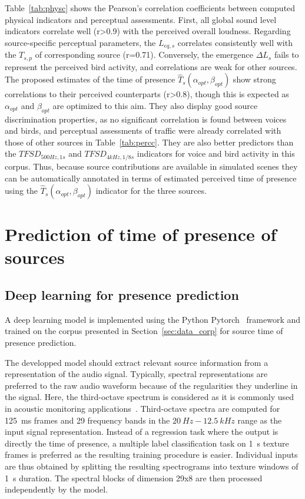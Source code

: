 \documentclass[twocolumn]{article}
\begin{document}
Table~\ref{tab:physc} shows the Pearson's correlation coefficients between computed physical indicators and perceptual assessments. First, all global sound level indicators correlate well (r>0.9) with the perceived overall loudness. Regarding source-specific perceptual parameters, the $L_{eq, s}$ correlates consistently well with the $T_{s, p}$ of corresponding source (r=0.71). Conversely, the emergence $\Delta L_s$ fails to represent the perceived bird activity, and correlations are weak for other sources. The proposed estimates of the time of presence $\hat T_s(\alpha_{opt}, \beta_{opt})$ show strong correlations to their perceived counterparts (r>0.8), though this is expected as $\alpha_{opt}$ and $\beta_{opt}$ are optimized to this aim. They also display good source discrimination properties, as no significant correlation is found between voices and birds, and perceptual assessments of traffic were already correlated with those of other sources in Table~\ref{tab:percc}. They are also better predictors than the $TFSD_{500Hz, 1s}$ and $TFSD_{4kHz, 1/8s}$ indicators for voice and bird activity in this corpus. Thus, because source contributions are available in simulated scenes they can be automatically annotated in terms of estimated perceived time of presence using the $\hat T_s(\alpha_{opt}, \beta_{opt})$ indicator for the three sources.




\section{Prediction of time of presence of sources}
\label{sec:pred}

\subsection{Deep learning for presence prediction}
\label{sec:pred_deep}

A deep learning model is implemented using the Python Pytorch~\cite{paszke2017} framework and trained on the corpus presented in Section~\ref{sec:data_corp} for source time of presence prediction.

The developped model should extract relevant source information from a representation of the audio signal. Typically, spectral representations are preferred to the raw audio waveform because of the regularities they underline in the signal. Here, the third-octave spectrum is considered as it is commonly used in acoustic monitoring applications~\cite{ardouin2018, gontier2017}. Third-octave spectra are computed for 125~ms frames and 29 frequency bands in the $20~Hz - 12.5~kHz$ range as the input signal representation. Instead of a regression task where the output is directly the time of presence, a multiple label classification task on 1~s texture frames is preferred as the resulting training procedure is easier. Individual inputs are thus obtained by splitting the resulting spectrograms into texture windows of 1~s duration. The spectral blocks of dimension 29x8 are then processed independently by the model.
\end{document}
